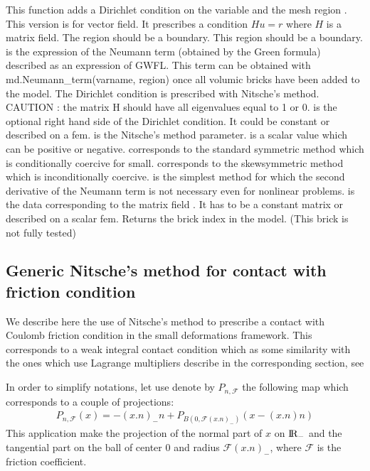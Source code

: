 \documentclass[a4paper,11pt,english]{sphinxmanual}
\begin{document}
This function adds a Dirichlet condition on the variable  and the mesh
region .
This version is for vector field. It prescribes a condition
\(Hu = r\) where \(H\) is a matrix field. The region should be a
boundary. This region should be a boundary. 
is the expression of the Neumann term (obtained by the Green formula)
described as an expression of GWFL. This term can be obtained with
md.Neumann\_term(varname, region) once all volumic bricks have
been added to the model. The Dirichlet
condition is prescribed with Nitsche’s method.
CAUTION : the matrix H should have all eigenvalues equal to 1 or 0.
 is the optional
right hand side of the Dirichlet condition. It could be constant or
described on a fem.  is the
Nitsche’s method parameter.  is a scalar value which can be
positive or negative.  corresponds to the standard symmetric
method which is conditionally coercive for   small.
 corresponds to the skew\sphinxhyphen{}symmetric method which is
inconditionally coercive.  is the simplest method
for which the second derivative of the Neumann term is not necessary
even for nonlinear problems.  is the data
corresponding to the matrix field . It has to be a constant matrix
or described on a scalar fem. Returns the brick index in the model.
(This brick is not fully tested)


\subsection{Generic Nitsche’s method for contact with friction condition}
\label{\detokenize{userdoc/model_Nitsche:generic-nitsche-s-method-for-contact-with-friction-condition}}\label{\detokenize{userdoc/model_Nitsche:nitsche-contact-small-def-section}}
We describe here the use of Nitsche’s method to prescribe a contact with Coulomb friction condition in the small deformations framework. This corresponds to a weak integral contact condition which as some similarity with the ones which use Lagrange multipliers describe in the corresponding section, see {\hyperref[\detokenize{userdoc/model_contact_friction:weak-integral-contact-section}]{}}

In order to simplify notations, let use denote by \(P_{n,\mathscr{F}}\) the following map which corresponds to a couple of projections:
\begin{equation*}
\begin{split}P_{n,\mathscr{F}}(x) = -(x.n)_- n + P_{B(0,\mathscr{F}(x.n)_-)}(x - (x.n)n)\end{split}
\end{equation*}
This application make the projection of the normal part of \(x\) on \(\rm I\hspace{-0.15em}R_-\) and the tangential part on the ball of center \(0\) and radius \(\mathscr{F}(x.n)_-\), where \(\mathscr{F}\) is the friction coefficient.
\end{document}
